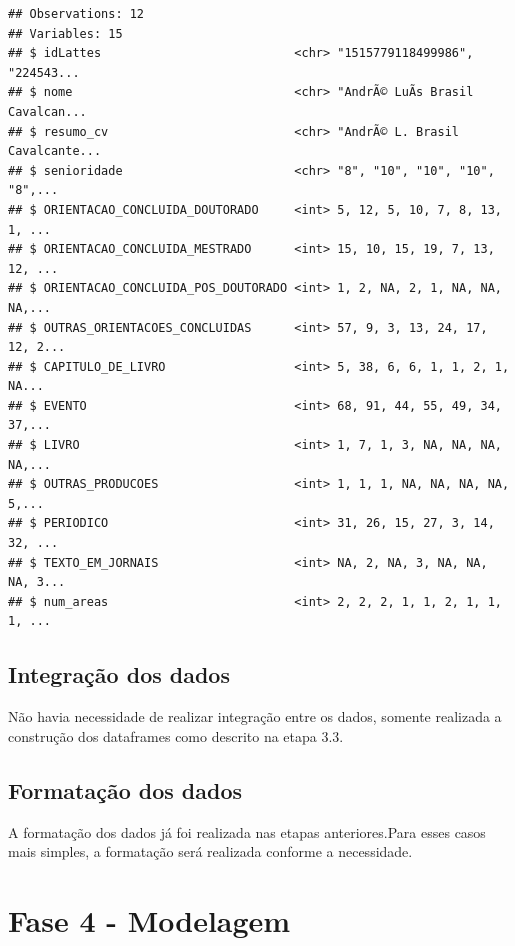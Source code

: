 \documentclass[]{article}
\begin{document}
\begin{verbatim}
## Observations: 12
## Variables: 15
## $ idLattes                           <chr> "1515779118499986", "224543...
## $ nome                               <chr> "AndrÃ© LuÃ­s Brasil Cavalcan...
## $ resumo_cv                          <chr> "AndrÃ© L. Brasil Cavalcante...
## $ senioridade                        <chr> "8", "10", "10", "10", "8",...
## $ ORIENTACAO_CONCLUIDA_DOUTORADO     <int> 5, 12, 5, 10, 7, 8, 13, 1, ...
## $ ORIENTACAO_CONCLUIDA_MESTRADO      <int> 15, 10, 15, 19, 7, 13, 12, ...
## $ ORIENTACAO_CONCLUIDA_POS_DOUTORADO <int> 1, 2, NA, 2, 1, NA, NA, NA,...
## $ OUTRAS_ORIENTACOES_CONCLUIDAS      <int> 57, 9, 3, 13, 24, 17, 12, 2...
## $ CAPITULO_DE_LIVRO                  <int> 5, 38, 6, 6, 1, 1, 2, 1, NA...
## $ EVENTO                             <int> 68, 91, 44, 55, 49, 34, 37,...
## $ LIVRO                              <int> 1, 7, 1, 3, NA, NA, NA, NA,...
## $ OUTRAS_PRODUCOES                   <int> 1, 1, 1, NA, NA, NA, NA, 5,...
## $ PERIODICO                          <int> 31, 26, 15, 27, 3, 14, 32, ...
## $ TEXTO_EM_JORNAIS                   <int> NA, 2, NA, 3, NA, NA, NA, 3...
## $ num_areas                          <int> 2, 2, 2, 1, 1, 2, 1, 1, 1, ...
\end{verbatim}

\hypertarget{integrauxe7uxe3o-dos-dados}{%
\subsection{Integração dos dados}\label{integrauxe7uxe3o-dos-dados}}

Não havia necessidade de realizar integração entre os dados, somente
realizada a construção dos dataframes como descrito na etapa 3.3.

\hypertarget{formatauxe7uxe3o-dos-dados}{%
\subsection{Formatação dos dados}\label{formatauxe7uxe3o-dos-dados}}

A formatação dos dados já foi realizada nas etapas anteriores.Para esses
casos mais simples, a formatação será realizada conforme a necessidade.

\hypertarget{fase-4---modelagem}{%
\section{Fase 4 - Modelagem}\label{fase-4---modelagem}}
\end{document}
